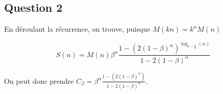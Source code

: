\subsection*{Question 2}

En déroulant la récurrence, on trouve, puisque $M(kn) = k^\alpha M(n)$

\[
    S(n) = M(n) \beta^\alpha \frac{1-(2(1-\beta)^\alpha)^{\log_{1-\frac{1}{\beta}} (n)}}{1-2(1-\beta)^\alpha}
\]

On peut donc prendre $C_\beta = \beta^\alpha \frac{1-(2(1-\beta)^\alpha)}{1-2(1-\beta)^\alpha}$.



